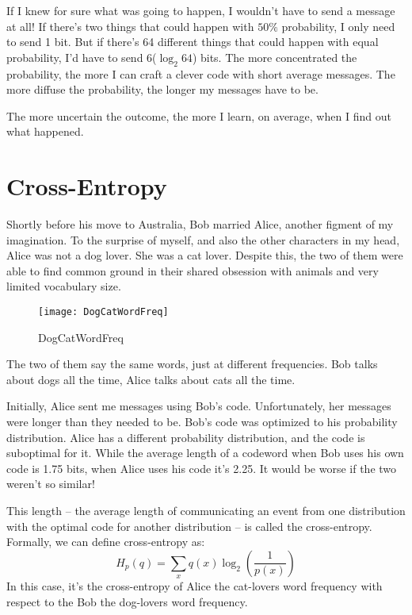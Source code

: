 If I knew for sure what was going to happen, I wouldn't have to send a message at all!
If there's two things that could happen with $50\%$ probability, I only need to send 1 bit.
But if there's 64 different things that could happen with equal probability, I'd have to send 6($\log_2{64}$) bits.
The more concentrated the probability, the more I can craft a clever code with short average messages.
The more diffuse the probability, the longer my messages have to be.

The more uncertain the outcome, the more I learn, on average, when I find out what happened.

\section{Cross-Entropy}
Shortly before his move to Australia, Bob married Alice, another figment of my imagination.
To the surprise of myself, and also the other characters in my head, Alice was not a dog lover. She was a cat lover.
Despite this, the two of them were able to find common ground in their shared obsession with animals and very limited vocabulary size.

\begin{figure}[htbp]
  \centering
  \texttt{[image: DogCatWordFreq]}\\
  \caption{DogCatWordFreq}\label{fig.entropy.DogCatWordFreq}
\end{figure}

The two of them say the same words, just at different frequencies. Bob talks about dogs all the time, Alice talks about cats all the time.

Initially, Alice sent me messages using Bob's code. Unfortunately, her messages were longer than they needed to be.
Bob's code was optimized to his probability distribution. Alice has a different probability distribution, and the code is suboptimal for it.
While the average length of a codeword when Bob uses his own code is 1.75 bits, when Alice uses his code it's 2.25.
It would be worse if the two weren't so similar!

This length – the average length of communicating an event from one distribution with the optimal code for another distribution – 
is called the cross-entropy.
Formally, we can define cross-entropy as:
$$H_p(q) = \sum_x q(x)\log_2\left(\frac{1}{p(x)}\right)$$
In this case, it's the cross-entropy of Alice the cat-lovers word frequency with respect to the Bob the dog-lovers word frequency.

